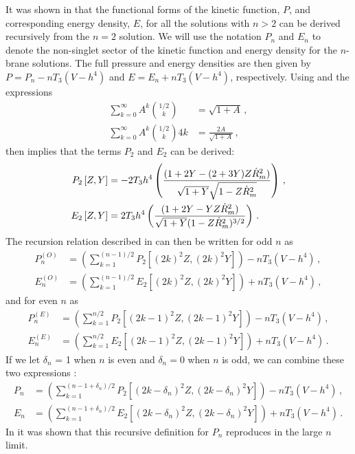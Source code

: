 It was shown in  that the functional forms of the kinetic function, $P$, and
corresponding energy density, $E$, for all the solutions with $n>2$
can be derived recursively from the $n=2$ solution. We will use the notation
$P_n$ and $E_n$ to denote the non-singlet sector of the kinetic function and energy density for
the $n$-brane solutions. The full pressure and energy densities are then 
given by $P = P_n - nT_3(V-h^4)$ and $E = E_n + nT_3 (V-h^4)$, respectively. Using
 and the expressions
% 
\begin{align}
 \sum_{k=0}^\infty A^k \binom{1/2}{k} &= \sqrt{1+A}\,,\\
 \sum_{k=0}^\infty A^k \binom{1/2}{k} 4k &= \frac{2A}{\sqrt{1+A}}\,,
\end{align}
% 
then implies that the terms $P_2$ and $E_2$ can be derived:
% 
\begin{align}
\label{eq:2brane}
P_2 \left[Z,Y\right] &= - 2 T_3 h^4 \left(\frac{(1+2Y -
(2+3Y)Z\dot{R}_m^2)}{\sqrt{1+Y}\sqrt{1-Z\dot{R}_m^2}}\right) \,, \nonumber \\
E_2 \left[Z,Y\right] &= 2 T_3 h^4 \left(\frac{(1+2Y -
YZ\dot{R}_m^2)}{\sqrt{1+Y}(1-Z\dot{R}_m^2)^{3/2}}\right) \,.
\end{align}
% 
% 
The recursion relation described in  can then be written for odd $n$ as
% 
\begin{align}
\label{eq:oddbrane}
P_n^{(O)} &= \left(\sum_{k=1}^{(n-1)/2} P_2 \left[(2k)^2Z, (2k)^2Y\right]
\right)-nT_3(V-h^4) \,, \nonumber \\
E_n^{(O)} &= \left(\sum_{k=1}^{(n-1)/2} E_2 \left[(2k)^2Z, (2k)^2Y \right]
\right)+
nT_3(V-h^4) \,,
\end{align}
% 
and for even $n$ as
%  
\begin{align}
\label{eq:evenbrane}
P_n^{(E)} &= \left(\sum_{k=1}^{n/2} P_2 \left[(2k-1)^2Z, (2k-1)^2Y\right]
\right)-nT_3(V-h^4) \,, \nonumber \\
E_n^{(E)} &= \left(\sum_{k=1}^{n/2} E_2 \left[(2k-1)^2Z, (2k-1)^2Y \right]
\right)+
nT_3(V-h^4) \,.
\end{align}
% 
If we let $\delta_n$ = 1 when $n$ is even and $\delta_n=0$ when $n$ is odd, we can
combine these two expressions \cite{Berndsen:2009ww}:
% 
\begin{align}
\label{eq:combinedPn-multi}
 P_n &= \left(\sum_{k=1}^{(n-1+\delta_n)/2} P_2 \left[(2k-\delta_n)^2Z,
(2k-\delta_n)^2Y\right]
\right)-nT_3(V-h^4) \,, \nonumber \\
% 
E_n &= \left(\sum_{k=1}^{(n-1+\delta_n)/2} E_2 \left[(2k-\delta_n)^2Z,
(2k-\delta_n)^2Y \right] \right)+ nT_3(V-h^4) \,.
\end{align}
% 
In  it was shown that this recursive definition for
$P_n$ reproduces  in the large $n$ limit. 

